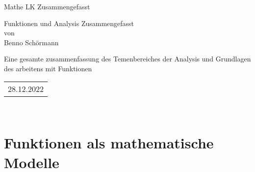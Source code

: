 \documentclass[fontsize=12pt,paper=a4,DIV12,cleardoublepage=empty, 
liststotoc,idxtotoc,bibtotoc]{article}
\theoremstyle{plain}
\theoremstyle{definition}
\begin{document}
	\begin{titlepage}
		\vspace*{-3cm}
		\noindent
		\hspace*{1cm}
			\begin{center}
				\centering
				{\LARGE Mathe LK Zusammengefasst}
			\end{center}
		\begin{center}
		\Large{ Funktionen und Analysis Zusammengefasst}\\[0.5cm]
		\normalsize{von}\\[0.25cm]	
		\large{Benno Schörmann}\\[0.5cm]
		\end{center}
	Eine gesamte zusammenfassung des Temenbereiches der Analysis und Grundlagen des arbeitens mit Funktionen
	\vfill
	\vfill
	\begin{tabular}{r}
	\Large{28.12.2022}\normalsize
	\end{tabular}
	\hfill
	\quad \\[1.5cm]
	\noindent 
	\renewcommand{\arraystretch}{1.4}
	\end{titlepage}
	\newpage
	\thispagestyle{empty}
	\tableofcontents
	\newpage
	
	
	
	\section{Funktionen als mathematische Modelle}
\end{document}
